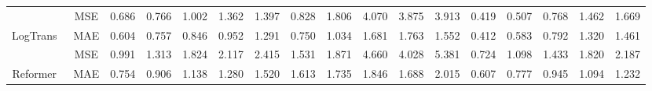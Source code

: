 \documentclass{article}
\begin{document}
\begin{table*}[htbp]
\begin{threeparttable}
{\begin{tabular}{c|c|c|c|c|c|c|c|c|c|c|c|c|c|c|c|c}
                                   & MSE                                & 0.686                        & 0.766                        & 1.002                        & 1.362                        & 1.397                        & 0.828                        & 1.806                        & 4.070                        & 3.875                        & 3.913                        & 0.419                        & 0.507                        & 0.768                        & 1.462                        & 1.669                        \\ \multirow{-2}{*}{LogTrans~\cite{li2019enhancing}}         & MAE                                & 0.604                        & 0.757                        & 0.846                        & 0.952                        & 1.291                        & 0.750                        & 1.034                        & 1.681                        & 1.763                        & 1.552                        & 0.412                        & 0.583                        & 0.792                        & 1.320                        & 1.461                        \\ \hline
                                   & MSE                                & 0.991                        & 1.313                        & 1.824                        & 2.117                        & 2.415                        & 1.531                        & 1.871                        & 4.660                        & 4.028                        & 5.381                        & 0.724                        & 1.098                        & 1.433                        & 1.820                        & 2.187                        \\ \multirow{-2}{*}{Reformer~\cite{kitaev2019reformer}}         & MAE                                & 0.754                        & 0.906                        & 1.138                        & 1.280                        & 1.520                        & 1.613                        & 1.735                        & 1.846                        & 1.688                        & 2.015                        & 0.607                        & 0.777                        & 0.945                        & 1.094                        & 1.232                        \\ \hline

\end{tabular}}
\end{threeparttable}
\end{table*}
\end{document}
